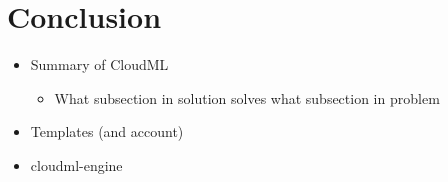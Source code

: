 \section{Conclusion}

\begin{itemize}
  \item Summary of CloudML
  \begin{itemize}
    \item What subsection in solution solves what subsection in problem
  \end{itemize}
  \item Templates (and account)
  \item cloudml-engine
\end{itemize}
